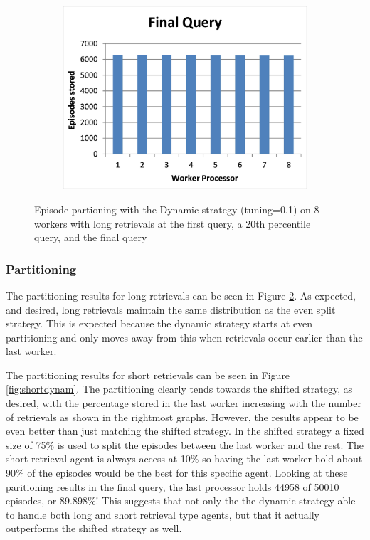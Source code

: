 \documentclass[11pt]{article} %
\begin{document}
\begin{figure}
\begin{subfigure}[b]{0.33\textwidth}
        \end{subfigure}%
        \begin{subfigure}[b]{0.33\textwidth}
                \centering
                \includegraphics[width=\textwidth]{images/longfinalquery}
                \label{fig:longdynam3}
        \end{subfigure}
        \caption{Episode partioning with the Dynamic strategy (tuning=0.1) on 8 workers with long retrievals at the first query, a 20th percentile query, and the final query}\label{fig:longdynam}
\end{figure}

\subsubsection{Partitioning}

The partitioning results for long retrievals can be seen in Figure \ref{fig:longdynam}.  As expected, and desired, long retrievals maintain the same distribution as the even split strategy.  This is expected because the dynamic strategy starts at even partitioning and only moves away from this when retrievals occur earlier than the last worker.

The partitioning results for short retrievals can be seen in Figure \ref{fig:shortdynam}. The partitioning clearly tends towards the shifted strategy, as desired, with the percentage stored in the last worker increasing with the number of retrievals as shown in the rightmost graphs.  However, the results appear to be even better than just matching the shifted strategy. In the shifted strategy a fixed size of 75\% is used to split the episodes between the last worker and the rest.  The short retrieval agent is always access at 10\% so having the last worker hold about 90\% of the episodes would be the best for this specific agent. Looking at these paritioning results in the final query, the last processor holds 44958 of 50010 episodes, or 89.898\%! This suggests that not only the the dynamic strategy able to handle both long and short retrieval type agents, but that it actually outperforms the shifted strategy as well.
\end{document}
